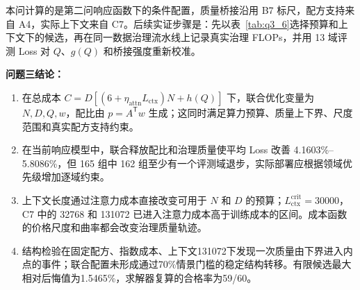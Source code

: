 本问计算的是第二问响应函数下的条件配置，质量桥接沿用 B7 标尺，配方支持来自 A4，实际上下文来自 C7。后续实证步骤是：先以表~\ref{tab:q3_6}选择预算和上下文下的候选，再在同一数据治理流水线上记录真实治理 FLOPs，并用 13 域评测 Loss 对 $Q$、$g(Q)$ 和桥接强度重新校准。

\textbf{问题三结论：}
\begin{enumerate}
    \item 在总成本 $C=D[(6+\eta_{\mathrm{attn}}L_{\mathrm{ctx}})N+h(Q)]$ 下，联合优化变量为 $N,D,Q,w$，配比由 $p=A^{\mathsf T}w$ 生成；这同时满足算力预算、质量上下界、尺度范围和真实配方支持约束。
    \item 在当前响应模型中，联合释放配比和治理质量使平均 Loss 改善 4.1603\%--5.8086\%，但 165 组中 162 组至少有一个评测域退步，实际部署应根据领域优先级增加逐域约束。
    \item 上下文长度通过注意力成本直接改变可用于 $N$ 和 $D$ 的预算；$L_{\mathrm{ctx}}^{\mathrm{crit}}=30000$，C7 中的 32768 和 131072 已进入注意力成本高于训练成本的区间。成本函数的价格尺度和曲率都会改变治理质量轨迹。
    \item 结构检验在固定配方、指数成本、上下文131072下发现一次质量由下界进入内点的事件；联合配置未形成通过70\%情景门槛的稳定结构转移。有限候选最大相对后悔值为1.5465\%，求解器复算的合格率为59/60。
\end{enumerate}
